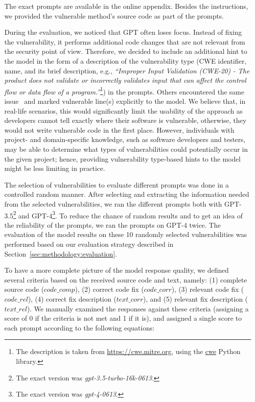 The exact prompts are available in the online appendix.
Besides the instructions, we provided the vulnerable method's source code as part of the prompts.

During the evaluation, we noticed that GPT often loses focus.
Instead of fixing the vulnerability, it performs additional code changes that are not relevant from the security point of view.
Therefore, we decided to include an additional hint to the model in the form of a description of the vulnerability type
(CWE identifier, name, and its brief description, e.g., \textit{``Improper Input Validation (CWE-20) - The product does not validate or incorrectly validates input that can affect the control flow or data flow of a program.''}\footnote{The description is taken from \url{https://cwe.mitre.org}, using the \href{https://pypi.org/project/cwe/}{cwe} Python library.}) in the prompts.
Others encountered the same issue~\cite{same_as_us_but_too_much_hint} and marked vulnerable line(s) explicitly to the model.
We believe that, in real-life scenarios, this would significantly limit the usability of the approach as developers cannot tell exactly where their software is vulnerable, otherwise, they would not write vulnerable code in the first place.
However, individuals with project- and domain-specific knowledge, such as software developers and testers, may be able to determine what types of vulnerabilities could potentially occur in the given project; hence, providing vulnerability type-based hints to the model might be less limiting in practice.


The selection of vulnerabilities to evaluate different prompts was done in a controlled random manner.
After selecting and extracting the information needed from the selected vulnerabilities, we ran the different prompts both with GPT-3.5\footnote{The exact version was \textit{gpt-3.5-turbo-16k-0613}.} and GPT-4\footnote{The exact version was \textit{gpt-4-0613}.}.
To reduce the chance of random results and to get an idea of the reliability of the prompts, we ran the prompts on GPT-4 twice.
The evaluation of the model results on these 10 randomly selected vulnerabilities was performed based on our evaluation strategy described in Section~\ref{sec:methodology:evaluation}.

To have a more complete picture of the model response quality, we defined several criteria based on the received source code and text, namely: (1) complete source code ($code\_comp$), (2) correct code fix ($code\_corr$), (3) relevant code fix ($code\_rel$), (4) correct fix description ($text\_corr$), and (5) relevant fix description ($text\_rel$).
We manually examined the responses against these criteria (assigning a score of 0 if the criteria is not met and 1 if it is), and assigned a single score to each prompt according to the following equations:


